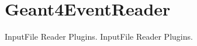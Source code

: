 \hypertarget{group___geant4_event_reader}{
\section{Geant4EventReader}
\label{group___geant4_event_reader}
}


InputFile Reader Plugins.  
InputFile Reader Plugins. 